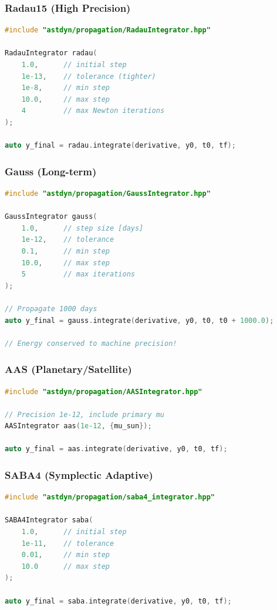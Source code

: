 \subsubsection{Radau15 (High Precision)}

\begin{lstlisting}[language=C++]
#include "astdyn/propagation/RadauIntegrator.hpp"

RadauIntegrator radau(
    1.0,      // initial step
    1e-13,    // tolerance (tighter)
    1e-8,     // min step
    10.0,     // max step
    4         // max Newton iterations
);

auto y_final = radau.integrate(derivative, y0, t0, tf);
\end{lstlisting}

\subsubsection{Gauss (Long-term)}

\begin{lstlisting}[language=C++]
#include "astdyn/propagation/GaussIntegrator.hpp"

GaussIntegrator gauss(
    1.0,      // step size [days]
    1e-12,    // tolerance
    0.1,      // min step
    10.0,     // max step
    5         // max iterations
);

// Propagate 1000 days
auto y_final = gauss.integrate(derivative, y0, t0, t0 + 1000.0);

// Energy conserved to machine precision!
\end{lstlisting}

\subsubsection{AAS (Planetary/Satellite)}

\begin{lstlisting}[language=C++]
#include "astdyn/propagation/AASIntegrator.hpp"

// Precision 1e-12, include primary mu
AASIntegrator aas(1e-12, {mu_sun}); 

auto y_final = aas.integrate(derivative, y0, t0, tf);
\end{lstlisting}

\subsubsection{SABA4 (Symplectic Adaptive)}

\begin{lstlisting}[language=C++]
#include "astdyn/propagation/saba4_integrator.hpp"

SABA4Integrator saba(
    1.0,      // initial step
    1e-11,    // tolerance
    0.01,     // min step
    10.0      // max step
);

auto y_final = saba.integrate(derivative, y0, t0, tf);
\end{lstlisting}

